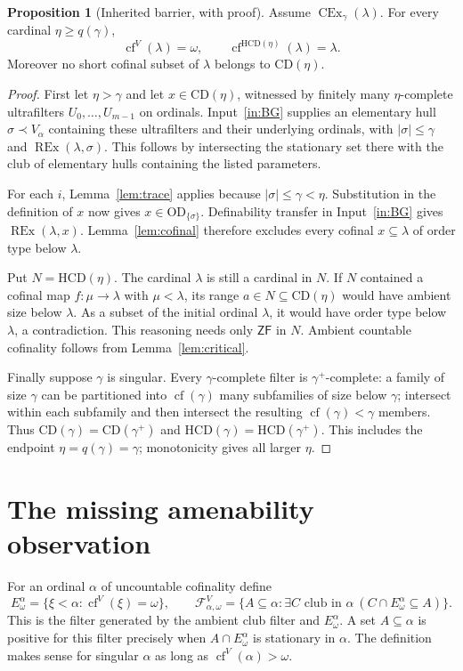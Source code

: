 \documentclass[11pt,letterpaper]{article}
\theoremstyle{definition}
\newtheorem{proposition}[definition]{Proposition}
\numberwithin{equation}{section}
\newcommand{\ZF}{\mathsf{ZF}}
\newcommand{\OD}{\mathrm{OD}}
\newcommand{\CD}{\mathrm{CD}}
\newcommand{\HCD}{\mathrm{HCD}}
\newcommand{\CEx}{\operatorname{CEx}}
\newcommand{\REx}{\operatorname{REx}}
\newcommand{\cf}{\operatorname{cf}}
\newcommand{\calF}{\mathcal F}
\begin{document}
\begin{proposition}[Inherited barrier, with proof]\label{prop:barrier}
Assume $\CEx_\gamma(\lambda)$. For every cardinal $\eta\ge q(\gamma)$,
\[
\cf^V(\lambda)=\omega,
\qquad
\cf^{\HCD(\eta)}(\lambda)=\lambda.
\]
Moreover no short cofinal subset of $\lambda$ belongs to $\CD(\eta)$.
\end{proposition}
\begin{proof}
First let $\eta>\gamma$ and let $x\in\CD(\eta)$, witnessed by finitely
many $\eta$-complete ultrafilters $U_0,\ldots,U_{m-1}$ on ordinals.
Input~\ref{in:BG} supplies an elementary hull $\sigma\prec V_\alpha$
containing these ultrafilters and their underlying ordinals, with
$|\sigma|\le\gamma$ and $\REx(\lambda,\sigma)$. This follows by
intersecting the stationary set there with the club of elementary
hulls containing the listed parameters.

For each $i$, Lemma~\ref{lem:trace} applies because
$|\sigma|\le\gamma<\eta$. Substitution in the definition of $x$ now
gives $x\in\OD_{\{\sigma\}}$. Definability transfer in
Input~\ref{in:BG} gives $\REx(\lambda,x)$. Lemma~\ref{lem:cofinal}
therefore excludes every cofinal $x\subseteq\lambda$ of order type
below $\lambda$.

Put $N=\HCD(\eta)$. The cardinal $\lambda$ is still a cardinal in $N$.
If $N$ contained a cofinal map $f:\mu\to\lambda$ with $\mu<\lambda$,
its range $a\in N\subseteq\CD(\eta)$ would have ambient size below
$\lambda$. As a subset of the initial ordinal $\lambda$, it would
have order type below $\lambda$, a contradiction. This reasoning needs
only $\ZF$ in $N$. Ambient countable cofinality follows from
Lemma~\ref{lem:critical}.

Finally suppose $\gamma$ is singular. Every $\gamma$-complete filter
is $\gamma^+$-complete: a family of size $\gamma$ can be partitioned
into $\cf(\gamma)$ many subfamilies of size below $\gamma$; intersect
within each subfamily and then intersect the resulting
$\cf(\gamma)<\gamma$ members. Thus
$\CD(\gamma)=\CD(\gamma^+)$ and
$\HCD(\gamma)=\HCD(\gamma^+)$. This includes the endpoint
$\eta=q(\gamma)=\gamma$; monotonicity gives all larger $\eta$.
\end{proof}

\section{The missing amenability observation}\label{sec:amenability}

For an ordinal $\alpha$ of uncountable cofinality define
\[
E^\alpha_\omega=\{\xi<\alpha:\cf^V(\xi)=\omega\},
\qquad
\calF^V_{\alpha,\omega}
=\{A\subseteq\alpha:\exists C\text{ club in }\alpha\
(C\cap E^\alpha_\omega\subseteq A)\}.
\]
This is the filter generated by the ambient club filter and
$E^\alpha_\omega$. A set $A\subseteq\alpha$ is positive for this
filter precisely when $A\cap E^\alpha_\omega$ is stationary in
$\alpha$. The definition makes sense for singular $\alpha$ as long as
$\cf^V(\alpha)>\omega$.
\end{document}
